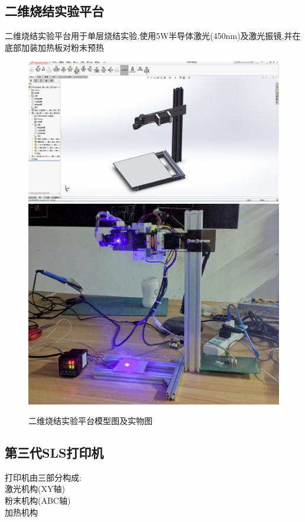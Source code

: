 \documentclass[a4paper,12pt,onecolumn,twoside]{article}
\begin{document}
\subsection{二维烧结实验平台}
二维烧结实验平台用于单层烧结实验,使用5W半导体激光(450nm)及激光振镜,并在底部加装加热板对粉末预热
\begin{figure}[ht]
\centering     
\includegraphics[width=0.8\linewidth]{MGSLS0_0.png}
\centering     
\includegraphics[width=0.8\linewidth]{MGSLS0_1.jpg}
\caption{二维烧结实验平台模型图及实物图}
\end{figure}
\newpage
\subsection{第三代SLS打印机}
打印机由三部分构成:\\
激光机构(XY轴)\\
粉末机构(ABC轴)\\
加热机构
\end{document}
